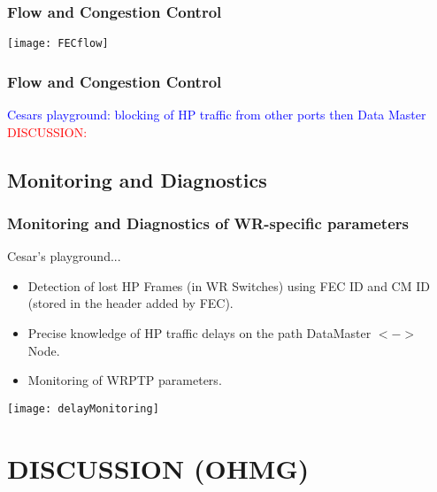 \documentclass[]{beamer}
\begin{document}
\begin{frame}
  \frametitle{Flow and Congestion Control }   
\centering
\texttt{[image: FECflow]}

\end{frame}


\begin{frame}
  \frametitle{Flow and Congestion Control}   

\textcolor{blue}{Cesars playground: blocking of HP traffic from other ports then
Data Master}
\centering
\textcolor{red}{DISCUSSION:} 

\end{frame}

\subsection{Monitoring and Diagnostics}
\begin{frame}
  \frametitle{Monitoring and Diagnostics of WR-specific parameters}   

Cesar's playground...
\begin{itemize}
 \item Detection of lost HP Frames (in WR Switches) using FEC ID and CM ID
      (stored in the header added by FEC).
 \item Precise knowledge of HP traffic delays on the path DataMaster $<->$ Node.
 \item Monitoring of WRPTP parameters.
\end{itemize}
\centering
\texttt{[image: delayMonitoring]}

\end{frame}

\section{DISCUSSION (OHMG)}
\end{document}

